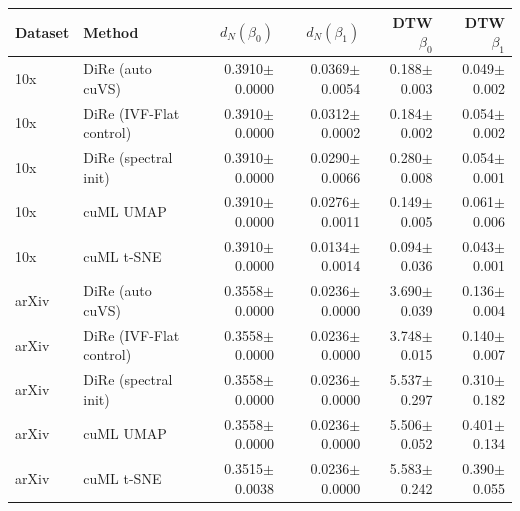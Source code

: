 \begin{tabular}{@{}llrrrr@{}}
\toprule
Dataset & Method & $d_N(\beta_0)$ & $d_N(\beta_1)$ & DTW $\beta_0$ & DTW $\beta_1$ \\
\midrule
10x & DiRe (auto cuVS) & 0.3910$\pm$0.0000 & 0.0369$\pm$0.0054 & 0.188$\pm$0.003 & 0.049$\pm$0.002 \\
10x & DiRe (IVF-Flat control) & 0.3910$\pm$0.0000 & 0.0312$\pm$0.0002 & 0.184$\pm$0.002 & 0.054$\pm$0.002 \\
10x & DiRe (spectral init) & 0.3910$\pm$0.0000 & 0.0290$\pm$0.0066 & 0.280$\pm$0.008 & 0.054$\pm$0.001 \\
10x & cuML UMAP & 0.3910$\pm$0.0000 & 0.0276$\pm$0.0011 & 0.149$\pm$0.005 & 0.061$\pm$0.006 \\
10x & cuML t-SNE & 0.3910$\pm$0.0000 & 0.0134$\pm$0.0014 & 0.094$\pm$0.036 & 0.043$\pm$0.001 \\
\addlinespace
arXiv & DiRe (auto cuVS) & 0.3558$\pm$0.0000 & 0.0236$\pm$0.0000 & 3.690$\pm$0.039 & 0.136$\pm$0.004 \\
arXiv & DiRe (IVF-Flat control) & 0.3558$\pm$0.0000 & 0.0236$\pm$0.0000 & 3.748$\pm$0.015 & 0.140$\pm$0.007 \\
arXiv & DiRe (spectral init) & 0.3558$\pm$0.0000 & 0.0236$\pm$0.0000 & 5.537$\pm$0.297 & 0.310$\pm$0.182 \\
arXiv & cuML UMAP & 0.3558$\pm$0.0000 & 0.0236$\pm$0.0000 & 5.506$\pm$0.052 & 0.401$\pm$0.134 \\
arXiv & cuML t-SNE & 0.3515$\pm$0.0038 & 0.0236$\pm$0.0000 & 5.583$\pm$0.242 & 0.390$\pm$0.055 \\
\bottomrule
\end{tabular}
